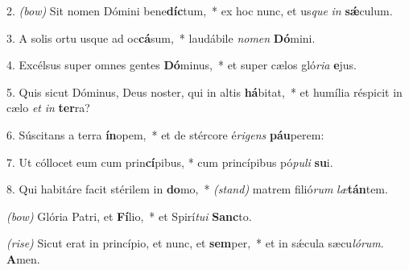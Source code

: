 2. \textit{(bow)} Sit nomen Dómini bene\textbf{díc}tum,~*
	ex hoc nunc, et us\textit{que} \textit{in} \textbf{s\'{\ae}}culum.

3. A solis ortu usque ad oc\textbf{cá}sum,~*
	laudábile \textit{no}\textit{men} \textbf{Dó}mini.

4. Excélsus super omnes gentes \textbf{Dó}minus,~*
	et super cælos gló\textit{ri}\textit{a} \textbf{e}jus.

5. Quis sicut Dóminus, Deus noster, qui in altis \textbf{há}bitat,~*
	et humília réspicit in cælo \textit{et} \textit{in} \textbf{ter}ra?

6. Súscitans a terra \textbf{ín}opem,~*
	et de stércore é\textit{ri}\textit{gens} \textbf{páu}perem:

7. Ut cóllocet eum cum prin\textbf{cí}pibus, *
	cum princípibus pó\textit{pu}\textit{li} \textbf{su}i.

8. Qui habitáre facit stérilem in \textbf{do}mo,~* {\color{red}\textit{(stand)}}
	matrem filió\textit{rum} \textit{læ}\textbf{tán}tem.

{\color{red}\textit{(bow)}} Glória Patri, et \textbf{Fí}lio,~*
	et Spirí\textit{tu}\textit{i} \textbf{Sanc}to.

{\color{red}\textit{(rise)}} Sicut erat in princípio, et nunc, et \textbf{sem}per,~*
	et in s\'{\ae}cula sæcu\textit{ló}\textit{rum}. \textbf{A}men.